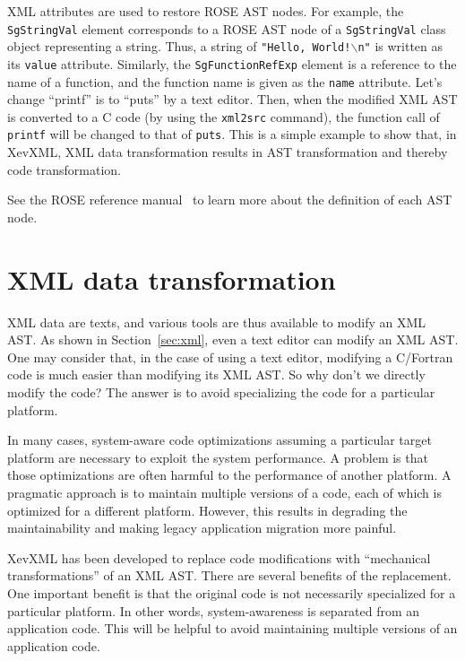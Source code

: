 XML attributes are used to restore ROSE AST nodes. For example, the
\texttt{SgStringVal} element corresponds to a ROSE AST node of a
\texttt{SgStringVal} class object representing a string.  Thus, a string
of \texttt{"Hello, World!$\backslash{}$n"} is written as its
\texttt{value} attribute. Similarly, the \texttt{SgFunctionRefExp}
element is a reference to the name of a function, and the function name
is given as the \texttt{name} attribute. Let's change ``printf'' is to
``puts'' by a text editor. Then, when the modified XML AST is converted
to a C code (by using the \texttt{xml2src} command), the function call
of \texttt{printf} will be changed to that of \texttt{puts}. This is a
simple example to show that, in XevXML, XML data transformation results
in AST transformation and thereby code transformation.

See the ROSE reference manual~\cite{rosemanual} to learn more about the
definition of each AST node.

\section{XML data transformation}\label{sec:xslt}

XML data are texts, and various tools are thus available to modify an
XML AST.  As shown in Section~\ref{sec:xml}, even a text editor can
modify an XML AST.  One may consider that, in the case of using a text
editor, modifying a C/Fortran code is much easier than modifying its XML
AST. So why don't we directly modify the code?  The answer is to avoid
specializing the code for a particular platform.

In many cases, system-aware code optimizations assuming a particular
target platform are necessary to exploit the system performance.  A
problem is that those optimizations are often harmful to the performance
of another platform.  A pragmatic approach is to maintain multiple
versions of a code, each of which is optimized for a different
platform. However, this results in degrading the maintainability and
making legacy application migration more painful.


XevXML has been developed to replace code modifications with
``mechanical transformations'' of an XML AST.  There are several
benefits of the replacement.  One important benefit is that the original
code is not necessarily specialized for a particular platform.  In other
words, system-awareness is separated from an application code.  This
will be helpful to avoid maintaining multiple versions of an application
code.

